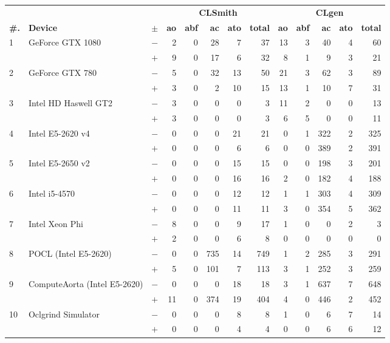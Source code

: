   \begin{tabular}{lll | rrrrr | rrrrr }
  \toprule
  & & & \multicolumn{5}{c|}{\textbf{CLSmith}} & \multicolumn{5}{c}{\textbf{CLgen}} \\
  \textbf{\#.} & \textbf{Device} & $\pm$ &
  \textbf{ao} & \textbf{abf} & \textbf{ac} & \textbf{ato} & \textbf{total} &
  \textbf{ao} & \textbf{abf} & \textbf{ac} & \textbf{ato} & \textbf{total} \\
  \midrule
  \multirow{ 2}{*}{1} & \multirow{ 2}{*}{GeForce GTX 1080} & $-$ & 2 & 0 & 28 & 7 & 37       & 13 & 3 & 40 & 4 & 60 \\& & $+$ & 9 & 0 & 17 & 6 & 32 & 8 & 1 & 9 & 3 & 21 \\
\hline
\multirow{ 2}{*}{2} & \multirow{ 2}{*}{GeForce GTX 780} & $-$ & 5 & 0 & 32 & 13 & 50       & 21 & 3 & 62 & 3 & 89 \\& & $+$ & 3 & 0 & 2 & 10 & 15 & 13 & 1 & 10 & 7 & 31 \\
\hline
\multirow{ 2}{*}{3} & \multirow{ 2}{*}{Intel HD Haswell GT2} & $-$ & 3 & 0 & 0 & 0 & 3       & 11 & 2 & 0 & 0 & 13 \\& & $+$ & 3 & 0 & 0 & 0 & 3 & 6 & 5 & 0 & 0 & 11 \\
\hline
\multirow{ 2}{*}{4} & \multirow{ 2}{*}{Intel E5-2620 v4} & $-$ & 0 & 0 & 0 & 21 & 21       & 0 & 1 & 322 & 2 & 325 \\& & $+$ & 0 & 0 & 0 & 6 & 6 & 0 & 0 & 389 & 2 & 391 \\
\hline
\multirow{ 2}{*}{5} & \multirow{ 2}{*}{Intel E5-2650 v2} & $-$ & 0 & 0 & 0 & 15 & 15       & 0 & 0 & 198 & 3 & 201 \\& & $+$ & 0 & 0 & 0 & 16 & 16 & 2 & 0 & 182 & 4 & 188 \\
\hline
\multirow{ 2}{*}{6} & \multirow{ 2}{*}{Intel i5-4570} & $-$ & 0 & 0 & 0 & 12 & 12       & 1 & 1 & 303 & 4 & 309 \\& & $+$ & 0 & 0 & 0 & 11 & 11 & 3 & 0 & 354 & 5 & 362 \\
\hline
\multirow{ 2}{*}{7} & \multirow{ 2}{*}{Intel Xeon Phi} & $-$ & 8 & 0 & 0 & 9 & 17       & 1 & 0 & 0 & 2 & 3 \\& & $+$ & 2 & 0 & 0 & 6 & 8 & 0 & 0 & 0 & 0 & 0 \\
\hline
\multirow{ 2}{*}{8} & \multirow{ 2}{*}{POCL (Intel E5-2620)} & $-$ & 0 & 0 & 735 & 14 & 749       & 1 & 2 & 285 & 3 & 291 \\& & $+$ & 5 & 0 & 101 & 7 & 113 & 3 & 1 & 252 & 3 & 259 \\
\hline
\multirow{ 2}{*}{9} & \multirow{ 2}{*}{ComputeAorta (Intel E5-2620)} & $-$ & 0 & 0 & 0 & 18 & 18       & 3 & 1 & 637 & 7 & 648 \\& & $+$ & 11 & 0 & 374 & 19 & 404 & 4 & 0 & 446 & 2 & 452 \\
\hline
\multirow{ 2}{*}{10} & \multirow{ 2}{*}{Oclgrind Simulator} & $-$ & 0 & 0 & 0 & 8 & 8       & 1 & 0 & 6 & 7 & 14 \\& & $+$ & 0 & 0 & 0 & 4 & 4 & 0 & 0 & 6 & 6 & 12 \\
  \bottomrule
\end{tabular}

